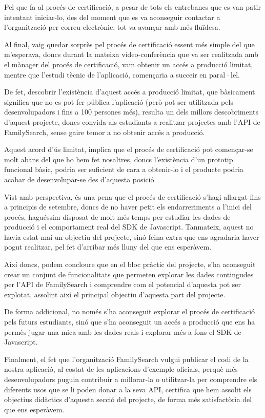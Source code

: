     Pel que fa al procés de certificació, a pesar de tots els entrebancs que es van patir intentant iniciar-lo, des del moment que es va aconseguir contactar a l'organització per correu electrònic, tot va avançar amb més fluïdesa.

    Al final, vaig quedar sorprès pel procés de certificació essent més simple del que m'esperava, doncs durant la mateixa vídeo-conferència que va ser realitzada amb el mànager del procés de certificació, vam obtenir un accés a producció limitat, mentre que l'estudi tècnic de l'aplicació, començaria a succeir en paral·lel.

    De fet, descobrir l'existència d'aquest accés a producció limitat, que bàsicament significa que no es pot fer pública l'aplicació (però pot ser utilitzada pels desenvolupadors i fins a 100 persones més), resulta un dels millors descobriments d'aquest projecte, doncs convida als estudiants a realitzar projectes amb l'API de FamilySearch, sense gaire temor a no obtenir accés a producció.

    Aquest acord d'ús limitat, implica que el procés de certificació pot començar-se molt abans del que ho hem fet nosaltres, doncs l'existència d'un prototip funcional bàsic, podria ser suficient de cara a obtenir-lo i el producte podria acabar de desenvolupar-se des d'aquesta posició.

    Vist amb perspectiva, és una pena que el procés de certificació s'hagi allargat fins a principis de setembre, doncs de no haver petit els endarreriments a l'inici del procés, haguéssim disposat de molt més temps per estudiar les dades de producció i el comportament real del SDK de Javascript. Tanmateix, aquest no havia estat mai un objectiu del projecte, sinó feina extra que ens agradaria haver pogut realitzar, pel fet d'arribar més lluny del que ens esperàvem.

    Així doncs, podem concloure que en el bloc pràctic del projecte, s'ha aconseguit crear un conjunt de funcionalitats que permeten explorar les dades contingudes per l'API de FamilySearch i comprendre com el potencial d'aquesta pot ser explotat, assolint així el principal objectiu d'aquesta part del projecte.

    De forma addicional, no només s'ha aconseguit explorar el procés de certificació pels futurs estudiants, sinó que s'ha aconseguit un accés a producció que ens ha permès jugar una mica amb les dades reals i explorar més a fons el SDK de Javascript.

    Finalment, el fet que l'organització FamilySearch vulgui publicar el codi de la nostra aplicació, al costat de les aplicacions d'exemple oficials, perquè més desenvolupadors puguin contribuir a millorar-la o utilitzar-la per comprendre els diferents usos que se li poden donar a la seva API, certifica que hem assolit els objectius didàctics d'aquesta secció del projecte, de forma més satisfactòria del que ens esperàvem.

